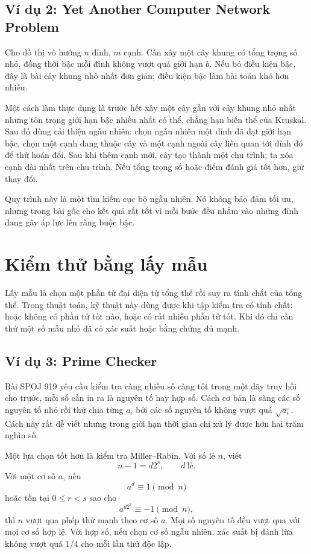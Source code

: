 \documentclass[11pt]{article}
\begin{document}
\subsection{Ví dụ 2: Yet Another Computer Network Problem}

Cho đồ thị vô hướng \(n\) đỉnh, \(m\) cạnh. Cần xây một cây khung có tổng
trọng số nhỏ, đồng thời bậc mỗi đỉnh không vượt quá giới hạn \(b\). Nếu bỏ
điều kiện bậc, đây là bài cây khung nhỏ nhất đơn giản; điều kiện bậc làm bài
toán khó hơn nhiều.

Một cách làm thực dụng là trước hết xây một cây gần với cây khung nhỏ nhất
nhưng tôn trọng giới hạn bậc nhiều nhất có thể, chẳng hạn biến thể của
Kruskal. Sau đó dùng cải thiện ngẫu nhiên: chọn ngẫu nhiên một đỉnh đã đạt
giới hạn bậc, chọn một cạnh đang thuộc cây và một cạnh ngoài cây liên quan tới
đỉnh đó để thử hoán đổi. Sau khi thêm cạnh mới, cây tạo thành một chu trình;
ta xóa cạnh dài nhất trên chu trình. Nếu tổng trọng số hoặc điểm đánh giá tốt
hơn, giữ thay đổi.

Quy trình này là một tìm kiếm cục bộ ngẫu nhiên. Nó không bảo đảm tối ưu,
nhưng trong bài gốc cho kết quả rất tốt vì mỗi bước đều nhắm vào những đỉnh
đang gây áp lực lên ràng buộc bậc.

\section{Kiểm thử bằng lấy mẫu}

Lấy mẫu là chọn một phần tử đại diện từ tổng thể rồi suy ra tính chất của tổng
thể. Trong thuật toán, kỹ thuật này dùng được khi tập kiểm tra có tính chất:
hoặc không có phần tử tốt nào, hoặc có rất nhiều phần tử tốt. Khi đó chỉ cần
thử một số mẫu nhỏ đã có xác suất hoặc bằng chứng đủ mạnh.

\subsection{Ví dụ 3: Prime Checker}

Bài SPOJ 919 yêu cầu kiểm tra càng nhiều số càng tốt trong một dãy truy hồi
cho trước, mỗi số cần in ra là nguyên tố hay hợp số. Cách cơ bản là sàng các
số nguyên tố nhỏ rồi thử chia từng \(a_i\) bởi các số nguyên tố không vượt quá
\(\sqrt{a_i}\). Cách này rất dễ viết nhưng trong giới hạn thời gian chỉ xử lý
được hơn hai trăm nghìn số.

Một lựa chọn tốt hơn là kiểm tra Miller--Rabin. Với số lẻ \(n\), viết
\[
  n-1=d2^s,\qquad d\ \text{lẻ}.
\]
Với một cơ số \(a\), nếu
\[
  a^d\equiv 1\pmod n
\]
hoặc tồn tại \(0\le r<s\) sao cho
\[
  a^{d2^r}\equiv -1\pmod n,
\]
thì \(n\) vượt qua phép thử mạnh theo cơ số \(a\). Mọi số nguyên tố đều vượt
qua với mọi cơ số hợp lệ. Với hợp số, nếu chọn cơ số ngẫu nhiên, xác suất bị
đánh lừa không vượt quá \(1/4\) cho mỗi lần thử độc lập.
\end{document}
